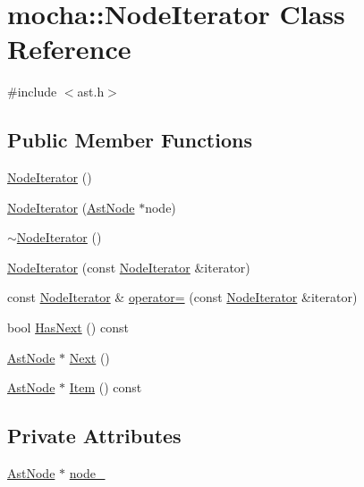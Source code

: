 \hypertarget{classmocha_1_1_node_iterator}{
\section{mocha::NodeIterator Class Reference}
\label{classmocha_1_1_node_iterator}
}


{\ttfamily \#include $<$ast.h$>$}

\subsection*{Public Member Functions}
\begin{DoxyCompactItemize}
\item 
\hyperlink{classmocha_1_1_node_iterator_a9172ad647b12ebf2edd8a5fdd2e8adf0}{NodeIterator} ()
\item 
\hyperlink{classmocha_1_1_node_iterator_aac68ce4595ee3582695a62fc212d8048}{NodeIterator} (\hyperlink{classmocha_1_1_ast_node}{AstNode} $\ast$node)
\item 
\hyperlink{classmocha_1_1_node_iterator_a34d0a2232287ad2766c4a15d412ee1a3}{$\sim$NodeIterator} ()
\item 
\hyperlink{classmocha_1_1_node_iterator_a14fc5b3897c87e019421e3ac5e4b7654}{NodeIterator} (const \hyperlink{classmocha_1_1_node_iterator}{NodeIterator} \&iterator)
\item 
const \hyperlink{classmocha_1_1_node_iterator}{NodeIterator} \& \hyperlink{classmocha_1_1_node_iterator_aff2301b58df1e9308e554d37cd60e7cb}{operator=} (const \hyperlink{classmocha_1_1_node_iterator}{NodeIterator} \&iterator)
\item 
bool \hyperlink{classmocha_1_1_node_iterator_ae3ce9ed39cc570c83549498c121c0150}{HasNext} () const 
\item 
\hyperlink{classmocha_1_1_ast_node}{AstNode} $\ast$ \hyperlink{classmocha_1_1_node_iterator_acc2e3f06c89bb07d2d64f2c024900d5b}{Next} ()
\item 
\hyperlink{classmocha_1_1_ast_node}{AstNode} $\ast$ \hyperlink{classmocha_1_1_node_iterator_a8d3448924e20dfa7c1eefb0c717a8eb4}{Item} () const 
\end{DoxyCompactItemize}
\subsection*{Private Attributes}
\begin{DoxyCompactItemize}
\item 
\hyperlink{classmocha_1_1_ast_node}{AstNode} $\ast$ \hyperlink{classmocha_1_1_node_iterator_af421e60da561c014ce3002285f03d2b4}{node\_\-}
\end{DoxyCompactItemize}


